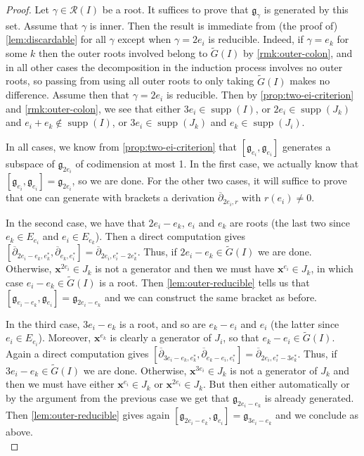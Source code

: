 \documentclass[11pt,letterpaper,reqno]{amsart}
\theoremstyle{remark}
\theoremstyle{definition}
\def\XX{\mathbf{x}}
\newcommand{\supp}[0]{\ensuremath{\operatorname{supp}}}
\begin{document}
\begin{proof}
Let $\gamma\in\mathcal R(I)$ be a root. It suffices to prove that $\mathfrak g_\gamma$ is generated by this set. Assume that $\gamma$ is inner. Then the result is immediate from (the proof of) \cref{lem:discardable} for all $\gamma$ except when $\gamma=2e_i$ is reducible. Indeed, if $\gamma=e_k$ for some $k$ then the outer roots involved belong to $\widetilde G(I)$ by \cref{rmk:outer-colon}, and in all other cases the decomposition in the induction process involves no outer roots, so passing from using all outer roots to only taking $\widetilde G(I)$ makes no difference. Assume then that $\gamma=2e_i$ is reducible. Then by \cref{prop:two-ei-criterion} and \cref{rmk:outer-colon}, we see that either $3e_i\in\supp(I)$, or $2e_i\in \supp(J_k)$ and $e_i+e_k\notin\supp(I)$, or $3e_i\in\supp(J_k)$ and $e_k\in\supp(J_i)$.

In all cases, we know from \cref{prop:two-ei-criterion} that $[\mathfrak g_{e_i},\mathfrak g_{e_i}]$ generates a subspace of $\mathfrak g_{2e_i}$ of codimension at most 1. In the first case, we actually know that $[\mathfrak g_{e_i},\mathfrak g_{e_i}]=\mathfrak g_{2e_i}$, so we are done. For the other two cases, it will suffice to prove that one can generate with brackets a derivation $\overline{\partial}_{2e_i,r}$ with $r(e_i)\neq0$.

In the second case, we have that $2e_i-e_k$, $e_i$ and $e_k$ are roots (the last two since $e_k\in E_{e_i}$ and $e_i\in E_{e_k}$). Then a direct computation gives $[\overline{\partial}_{2e_i-e_k,e_k^*},\overline{\partial}_{e_k,e_i^*}]=\overline{\partial}_{2e_i,e_i^*-2e_k^*}$.
Thus, if $2e_i-e_k\in\widetilde G(I)$ we are done. Otherwise, $\XX^{2e_i}\in J_k$ is not a generator and then we must have $\XX^{e_i}\in J_k$, in which case $e_i-e_k\in\widetilde G(I)$ is a root. Then \cref{lem:outer-reducible} tells us that $[\mathfrak g_{e_i-e_k},\mathfrak g_{e_i}]=\mathfrak g_{2e_i-e_k}$ and we can construct the same bracket as before.

In the third case, $3e_i-e_k$ is a root, and so are $e_k-e_i$ and $e_i$ (the latter since $e_i\in E_{e_i}$). Moreover, $\XX^{e_k}$ is clearly a generator of $J_i$, so that $e_k-e_i\in\widetilde G(I)$. Again a direct computation gives $[\overline{\partial}_{3e_i-e_k,e_k^*},\overline{\partial}_{e_k-e_i,e_i^*}]=\overline{\partial}_{2e_i,e_i^*-3e_k^*}$. Thus, if $3e_i-e_k\in\widetilde G(I)$ we are done. Otherwise, $\XX^{3e_i}\in J_k$ is not a generator of $J_k$ and then we must have either $\XX^{e_i}\in J_k$ or $\XX^{2e_i}\in J_k$. But then either automatically or by the argument from the previous case we get that $\mathfrak g_{2e_i-e_k}$ is already generated. Then \cref{lem:outer-reducible} gives again $[\mathfrak g_{2e_i-e_k},\mathfrak g_{e_i}]=\mathfrak g_{3e_i-e_k}$ and we conclude as above.\\


\end{proof}
\end{document}
